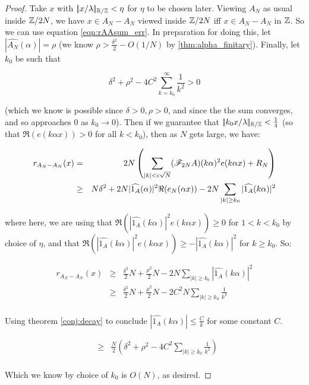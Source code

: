\documentclass{report}
\theoremstyle{remark}
\numberwithin{equation}{section}
\begin{document}
\begin{proof}
  Take $x$ with $|\!|x/\lambda|\!|_{\mathbb{R}/\mathbb{Z}} < \eta$ for $\eta$ to be chosen
  later.  Viewing $A_N$ as usual inside $\mathbb{Z}/2N$, we have
  $x \in A_N - A_N$ viewed inside $\mathbb{Z}/2N$ iff $x \in A_N - A_N$ in
  $\mathbb{Z}$.  So we can use equation \ref{eqn:rAAsum_err}.  In preparation
  for doing this, let $|\widehat{A_N}(\alpha)| = \rho$ (we know
  $\rho > \frac{\delta^2}{2} - O(1/N)$ by \ref{thm:alpha_finitary}).
  Finally, let $k_0$ be such that

  \[\delta^2 + \rho^2 - 4 C^2 \sum_{k=k_0}^\infty \frac{1}{k^2} > 0\]

  (which we know is possible since $\delta > 0, \rho > 0$, and since
  the the sum converges, and so approaches 0 as $k_0 \to 0$).  Then if
  we guarantee that $|\!|k_0 x/\lambda|\!|_{\mathbb{R}/\mathbb{Z}} < \frac14$ (so that
  $\Re(e(k\alpha x)) > 0$ for all $k < k_0$), then as $N$ gets large, we
  have:

  \begin{eqnarray*}
    r_{A_N - A_N}(x) &=& 2N \left(\sum_{|k| < c\sqrt{N}}
                       (\mathscr{F}_{2N}A)(k\alpha)^2 e(k\alpha x) + R_N\right)\\
                     &\geq& N \delta^2 + 2N
                            |\widehat{1_A}(\alpha)|^2
                            \Re(e_N(\alpha x)) - 2N \sum_{|k| \geq k_0}
                            |\widehat{1_A}(k\alpha)|^2\\
  \end{eqnarray*}

  where here, we are using that
  $\Re(|\widehat{1_A}(k\alpha)|^2 e(k\alpha x)) \geq 0$ for
  $1 < k < k_0$ by choice of $\eta$, and that
  $\Re(|\widehat{1_A}(k\alpha)|^2 e(k\alpha x)) \geq
  -|\widehat{1_A}(k\alpha)|^2$ for $k \geq k_0$.  So: 

  \begin{eqnarray*}
    r_{A_N - A_N}(x) &\geq& \frac{\delta^2}{2} N + \frac{\rho^2}{2} N
                            - 2N \sum_{|k| \geq k_0} |\widehat{1_A}(k\alpha)|^2\\
                     &\geq& \frac{\delta^2}{2} N + \frac{\rho^2}{2} N
                            - 2C^2 N \sum_{|k| \geq k_0}
                            \frac{1}{k^2}\\
  \end{eqnarray*}


  Using theorem \ref{conj:decay} to conclude
  $|\widehat{1_A}(k\alpha)| \leq \frac{C}{k}$ for some constant $C$.

  \begin{eqnarray*}
    &\geq& \frac{N}{2}\left(\delta^2 + \rho^2 - 4C^2 \sum_{|k| \geq k_0} \frac{1}{k^2}\right)\\
  \end{eqnarray*}
  
  Which we know by choice of $k_0$ is $O(N)$, as desired.  

\end{proof}
\end{document}
